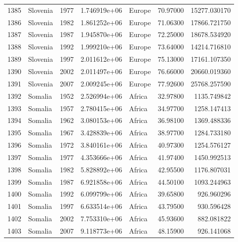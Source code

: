 \documentclass[
  letterpaper,
  DIV=11,
  numbers=noendperiod]{scrreprt}
\begin{document}
\begin{tabular}{llrrlrr}
1385 &                  Slovenia &  1977 &  1.746919e+06 &    Europe &  70.97000 &   15277.030170 \\
1386 &                  Slovenia &  1982 &  1.861252e+06 &    Europe &  71.06300 &   17866.721750 \\
1387 &                  Slovenia &  1987 &  1.945870e+06 &    Europe &  72.25000 &   18678.534920 \\
1388 &                  Slovenia &  1992 &  1.999210e+06 &    Europe &  73.64000 &   14214.716810 \\
1389 &                  Slovenia &  1997 &  2.011612e+06 &    Europe &  75.13000 &   17161.107350 \\
1390 &                  Slovenia &  2002 &  2.011497e+06 &    Europe &  76.66000 &   20660.019360 \\
1391 &                  Slovenia &  2007 &  2.009245e+06 &    Europe &  77.92600 &   25768.257590 \\
1392 &                   Somalia &  1952 &  2.526994e+06 &    Africa &  32.97800 &    1135.749842 \\
1393 &                   Somalia &  1957 &  2.780415e+06 &    Africa &  34.97700 &    1258.147413 \\
1394 &                   Somalia &  1962 &  3.080153e+06 &    Africa &  36.98100 &    1369.488336 \\
1395 &                   Somalia &  1967 &  3.428839e+06 &    Africa &  38.97700 &    1284.733180 \\
1396 &                   Somalia &  1972 &  3.840161e+06 &    Africa &  40.97300 &    1254.576127 \\
1397 &                   Somalia &  1977 &  4.353666e+06 &    Africa &  41.97400 &    1450.992513 \\
1398 &                   Somalia &  1982 &  5.828892e+06 &    Africa &  42.95500 &    1176.807031 \\
1399 &                   Somalia &  1987 &  6.921858e+06 &    Africa &  44.50100 &    1093.244963 \\
1400 &                   Somalia &  1992 &  6.099799e+06 &    Africa &  39.65800 &     926.960296 \\
1401 &                   Somalia &  1997 &  6.633514e+06 &    Africa &  43.79500 &     930.596428 \\
1402 &                   Somalia &  2002 &  7.753310e+06 &    Africa &  45.93600 &     882.081822 \\
1403 &                   Somalia &  2007 &  9.118773e+06 &    Africa &  48.15900 &     926.141068 \\

\end{tabular}
\end{document}
